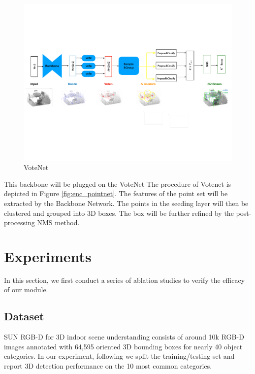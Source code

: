 \documentclass[runningheads]{llncs}
\begin{document}
\begin{figure}[t]
\begin{minipage}{1.\textwidth}
    \centering
    \includegraphics[width=1.0\linewidth]{eccv2020kit/Figure/VoteNet.pdf}
    \caption{VoteNet}
\end{minipage}
\label{fig:votenet}
\end{figure}


This backbone will be plugged on the VoteNet \cite{VoteNet}
The procedure of Votenet is depicted in Figure \ref{fig:enc_pointnet}. The features of the point set will be extracted by the Backbone Network. The points in the seeding layer will then be clustered and grouped into 3D boxes. The box will be further refined by the post-processing NMS method.

\section{Experiments}
\label{section:experiment}
In this section, we first conduct a series of ablation studies to verify the efficacy of our module. 

\subsection{Dataset}
SUN RGB-D \cite{SUN_RGBD} for 3D indoor scene understanding consists of around 10k RGB-D images annotated with 64,595 oriented 3D bounding boxes for nearly 40 object categories. In our experiment, following \cite{VoteNet} we split the training/testing set and report 3D detection performance on the 10 most common categories. 
\end{document}
